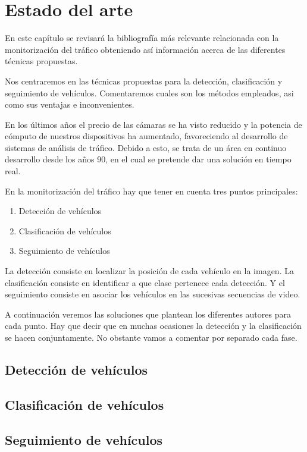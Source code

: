 \chapter{Estado del arte}\label{cap.estado}

En este capítulo se revisará la bibliografía más relevante relacionada con la monitorización del tráfico obteniendo así información acerca de las diferentes técnicas propuestas. 

Nos centraremos en las técnicas propuestas para la detección, clasificación y seguimiento de vehículos. Comentaremos cuales son los métodos empleados, asi como sus ventajas e inconvenientes.

En los últimos años el precio de las cámaras se ha visto reducido y la potencia de cómputo de nuestros dispositivos ha aumentado, favoreciendo al desarrollo de sistemas de análisis de tráfico. Debido a esto, se trata de un área en continuo desarrollo desde los años 90, en el cual se pretende dar una solución en tiempo real. 

En la monitorización del tráfico hay que tener en cuenta tres puntos principales:
\begin{enumerate}
    \item Detección de vehículos
    \item Clasificación de vehículos
    \item Seguimiento de vehículos
\end{enumerate}

La detección consiste en localizar la posición de cada vehículo en la imagen. La clasificación consiste en identificar a que clase pertenece cada detección. Y el seguimiento consiste en asociar los vehículos en las sucesivas secuencias de video.

A continuación veremos las soluciones que plantean los diferentes autores para cada punto. Hay que decir que en muchas ocasiones la detección y la clasificación se hacen conjuntamente. No obstante vamos a comentar por separado cada fase.

\section{Detección de vehículos}

\section{Clasificación de vehículos}

\section{Seguimiento de vehículos}

